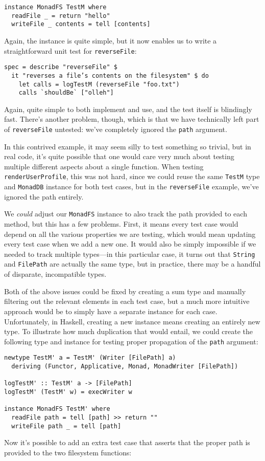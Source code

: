 \begin{verbatim}
instance MonadFS TestM where
  readFile _ = return "hello"
  writeFile _ contents = tell [contents]
\end{verbatim}
Again, the instance is quite simple, but it now enables us to write a
straightforward unit test for \texttt{reverseFile}:

\begin{verbatim}
spec = describe "reverseFile" $
  it "reverses a file’s contents on the filesystem" $ do
    let calls = logTestM (reverseFile "foo.txt")
    calls `shouldBe` ["olleh"]
\end{verbatim}
Again, quite simple to both implement and use, and the test itself is
blindingly fast. There's another problem, though, which is that we have
technically left part of \texttt{reverseFile} untested: we've completely
ignored the \texttt{path} argument.

In this contrived example, it may seem silly to test something so
trivial, but in real code, it's quite possible that one would care very
much about testing multiple different aspects about a single function.
When testing \texttt{renderUserProfile}, this was not hard, since we
could reuse the same \texttt{TestM} type and \texttt{MonadDB} instance
for both test cases, but in the \texttt{reverseFile} example, we've
ignored the path entirely.

We \emph{could} adjust our \texttt{MonadFS} instance to also track the
path provided to each method, but this has a few problems. First, it
means every test case would depend on all the various properties we are
testing, which would mean updating every test case when we add a new
one. It would also be simply impossible if we needed to track multiple
types---in this particular case, it turns out that \texttt{String} and
\texttt{FilePath} are actually the same type, but in practice, there may
be a handful of disparate, incompatible types.

Both of the above issues could be fixed by creating a sum type and
manually filtering out the relevant elements in each test case, but a
much more intuitive approach would be to simply have a separate instance
for each case. Unfortunately, in Haskell, creating a new instance means
creating an entirely new type. To illustrate how much duplication that
would entail, we could create the following type and instance for
testing proper propagation of the \texttt{path} argument:

\begin{verbatim}
newtype TestM' a = TestM' (Writer [FilePath] a)
  deriving (Functor, Applicative, Monad, MonadWriter [FilePath])

logTestM' :: TestM' a -> [FilePath]
logTestM' (TestM' w) = execWriter w

instance MonadFS TestM' where
  readFile path = tell [path] >> return ""
  writeFile path _ = tell [path]
\end{verbatim}
Now it's possible to add an extra test case that asserts that the proper
path is provided to the two filesystem functions:

